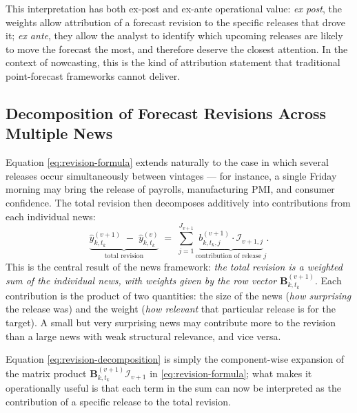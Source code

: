 \documentclass[11pt, a4paper, oneside]{article}
\begin{document}
This interpretation has both ex-post and ex-ante operational value:
\emph{ex post}, the weights allow attribution of a forecast revision
to the specific releases that drove it; \emph{ex ante}, they allow
the analyst to identify which upcoming releases are likely to move
the forecast the most, and therefore deserve the closest attention.
In the context of nowcasting, this is the kind of attribution
statement that traditional point-forecast frameworks cannot deliver.

\subsection{Decomposition of Forecast Revisions Across Multiple News}
\label{subsec:news-decomposition}

Equation \eqref{eq:revision-formula} extends naturally to the case in
which several releases occur simultaneously between vintages — for
instance, a single Friday morning may bring the release of payrolls,
manufacturing PMI, and consumer confidence. The total revision then
decomposes additively into contributions from each individual news:
\begin{equation}
\underbrace{\hat{y}_{k, t_k}^{(v+1)} \;-\; \hat{y}_{k, t_k}^{(v)}}_{\text{total revision}}
\;=\;
\sum_{j = 1}^{J_{v+1}} \underbrace{b_{k, t_k, j}^{(v+1)} \cdot \mathcal{I}_{v+1, j}}_{\text{contribution of release } j}.
\label{eq:revision-decomposition}
\end{equation}
This is the central result of the news framework: \emph{the total
revision is a weighted sum of the individual news, with weights
given by the row vector} $\mathbf{B}^{(v+1)}_{k, t_k}$. Each
contribution is the product of two quantities: the size of the
news (\emph{how surprising} the release was) and the weight
(\emph{how relevant} that particular release is for the target).
A small but very surprising news may contribute more to the revision
than a large news with weak structural relevance, and vice versa.

Equation \eqref{eq:revision-decomposition} is simply the
component-wise expansion of the matrix product
$\mathbf{B}_{k, t_k}^{(v+1)} \mathcal{I}_{v+1}$ in
\eqref{eq:revision-formula}; what makes it operationally useful is
that each term in the sum can now be interpreted as the
contribution of a specific release to the total revision.
\end{document}
